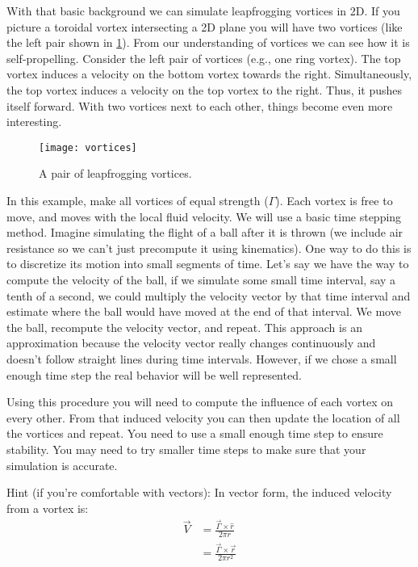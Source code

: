 \documentclass{article}
\begin{document}
With that basic background we can simulate leapfrogging vortices in 2D.  If you picture a toroidal vortex intersecting a 2D plane you will have two vortices (like the left pair shown in \cref{fig:vortices}).  From our understanding of vortices we can see how it is self-propelling.  Consider the left pair of vortices (e.g., one ring vortex).  The top vortex induces a velocity on the bottom vortex towards the right.  Simultaneously, the top vortex induces a velocity on the top vortex to the right.  Thus, it pushes itself forward.  With two vortices next to each other, things become even more interesting.

\begin{figure}[htb]
\centering
\texttt{[image: vortices]}
\caption{A pair of leapfrogging vortices.}
\label{fig:vortices}
\end{figure}

In this example, make all vortices of equal strength ($\Gamma$).  Each vortex is free to move, and moves with the local fluid velocity.  We will use a basic time stepping method.  Imagine simulating the flight of a ball after it is thrown (we include air resistance so we can't just precompute it using kinematics).  One way to do this is to discretize its motion into small segments of time.  Let's say we have the way to compute the velocity of the ball, if we simulate some small time interval, say a tenth of a second, we could multiply the velocity vector by that time interval and estimate where the ball would have moved at the end of that interval.  We move the ball, recompute the velocity vector, and repeat. This approach is an approximation because the velocity vector really changes continuously and doesn't follow straight lines during time intervals.  However, if we chose a small enough time step the real behavior will be well represented.

Using this procedure you will need to compute the influence of each vortex on every other.  From that induced velocity you can then update the location of all the vortices and repeat.  You need to use a small enough time step to ensure stability.  You may need to try smaller time steps to make sure that your simulation is accurate.

Hint (if you're comfortable with vectors): In vector form, the induced velocity from a vortex is:
\begin{equation}
    \begin{aligned}
        \vec{V} &= \frac{\vec{\Gamma} \times \hat{r}}{2 \pi r}\\
        &= \frac{\vec{\Gamma} \times \vec{r}}{2 \pi r^2}
    \end{aligned}
\end{equation}
\end{document}
